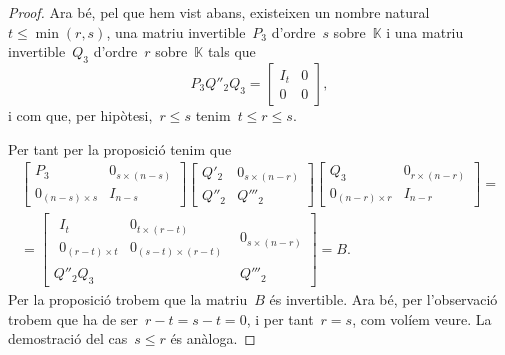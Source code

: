 \documentclass[../../main.tex]{subfiles}
\begin{document}
\begin{proof}
        Ara bé, pel que hem vist abans, existeixen un nombre natural~\(t\leq\min(r,s)\), una matriu invertible~\(P_{3}\) d'ordre~\(s\) sobre~\(\mathbb{K}\) i una matriu invertible~\(Q_{3}\) d'ordre~\(r\) sobre~\(\mathbb{K}\) tals que
        \[P_{3}Q''_{2}Q_{3}=\left[\begin{array}{c|c}
        I_{t} & 0 \\\hline
        0 & 0
        \end{array}\right],\]
        i com que, per hipòtesi,~\(r\leq s\) tenim~\(t\leq r\leq s\).

        Per tant per la proposició  tenim que
        \begin{multline*}
        \left[\begin{array}{c|c}
        P_{3} & 0_{s\times(n-s)} \\\hline
        0_{(n-s)\times s} & I_{n-s}
        \end{array}\right]
        \left[\begin{array}{c|c}
        Q'_{2} & 0_{s\times(n-r)} \\\hline
        Q''_{2} & Q'''_{2}
        \end{array}\right]
        \left[\begin{array}{c|c}
        Q_{3} & 0_{r\times(n-r)} \\\hline
        0_{(n-r)\times r} & I_{n-r}
        \end{array}\right]=\\=
        \left[\begin{array}{c|c}
            \begin{array}{c|c}
            I_{t} & 0_{t\times(r-t)} \\\hline
            0_{(r-t)\times t} & 0_{(s-t)\times(r-t)}
            \end{array}
        & 0_{s\times(n-r)} \\\hline
        Q''_{2}Q_{3} & Q'''_{2}
        \end{array}\right]=B.
        \end{multline*}
        Per la proposició  trobem que la matriu~\(B\) és invertible.
        Ara bé, per l'observació  trobem que ha de ser~\(r-t=s-t=0\), i per tant~\(r=s\), com volíem veure.
        La demostració del cas~\(s\leq r\) és anàloga.
    \end{proof}
\end{document}
